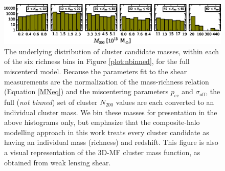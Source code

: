 \begin{figure}
\begin{center}
  \includegraphics[scale=1.0]{plots_ch4/m200panels_NoGaps.eps}
  \caption[Cluster Mass Distributions for each Richness Bin]{The underlying distribution of cluster candidate masses, within each of the six richness bins in Figure \ref{plot:nbinned}, for the full miscenterd model. Because the parameters fit to the shear measurements are the normalization of the mass-richness relation (Equation \ref{MNeq}) and the miscentering parameters $p_{\mathrm{cc}}$ and $\sigma_{\mathrm{off}}$, the full ({\it not binned}) set of cluster $N_{200}$ values are each converted to an individual cluster mass. We bin these masses for presentation in the above histograms only, but emphasize that the composite-halo modelling approach in this work treats every cluster candidate as having an individual mass (richness) and redshift. This figure is also a visual representation of the \ac{3D-MF} cluster mass function, as obtained from weak lensing shear.}
\label{plot:multimass}
\end{center}
\end{figure}


